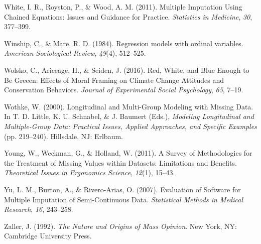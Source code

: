\documentclass[12pt,econ]{sources/authesis}
\begin{document}
\leavevmode\hypertarget{ref-white_2011_multiple}{}%
White, I. R., Royston, P., \& Wood, A. M. (2011). Multiple Imputation Using Chained Equations: Issues and Guidance for Practice. \emph{Statistics in Medicine}, \emph{30}, 377--399.

\leavevmode\hypertarget{ref-winship_1984_regression}{}%
Winship, C., \& Mare, R. D. (1984). Regression models with ordinal variables. \emph{American Sociological Review}, \emph{49}(4), 512--525.

\leavevmode\hypertarget{ref-wolsko_2016_white}{}%
Wolsko, C., Ariceage, H., \& Seiden, J. (2016). Red, White, and Blue Enough to Be Greeen: Effects of Moral Framing on Climate Change Attitudes and Conservation Behaviors. \emph{Journal of Experimental Social Psychology}, \emph{65}, 7--19.

\leavevmode\hypertarget{ref-wothke_2000_longitudinal}{}%
Wothke, W. (2000). Longitudinal and Multi-Group Modeling with Missing Data. In T. D. Little, K. U. Schnabel, \& J. Baumert (Eds.), \emph{Modeling Longitudinal and Multiple-Group Data: Practical Issues, Applied Approaches, and Specific Examples} (pp. 219--240). Hillsdale, NJ: Erlbaum.

\leavevmode\hypertarget{ref-young_2011_survey}{}%
Young, W., Weckman, G., \& Holland, W. (2011). A Survey of Methodologies for the Treatment of Missing Values within Datasets: Limitations and Benefits. \emph{Theoretical Issues in Ergonomics Science}, \emph{12}(1), 15--43.

\leavevmode\hypertarget{ref-yu_2007_evaluation}{}%
Yu, L. M., Burton, A., \& Rivero-Arias, O. (2007). Evaluation of Software for Multiple Imputation of Semi-Continuous Data. \emph{Statistical Methods in Medical Research}, \emph{16}, 243--258.

\leavevmode\hypertarget{ref-zaller_nature_1992}{}%
Zaller, J. (1992). \emph{The Nature and Origins of Mass Opinion}. New York, NY: Cambridge University Press.
\end{document}
